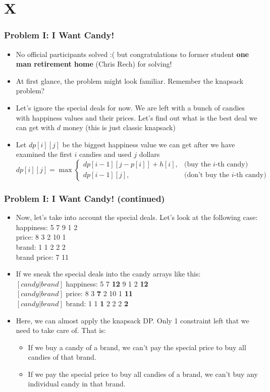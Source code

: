 \section{X}%
\label{sec:X}

\begin{frame}
  \frametitle{Problem I: I Want Candy!}
  \begin{itemize}
    \item No official participants solved :( but congratulations to former student \textbf{one man retirement home} (Chris Rech) for solving!
    \item At first glance, the problem might look familiar. Remember the knapsack problem?
    \item Let's ignore the special deals for now. We are left with a bunch of candies with happiness values and their prices. Let's find out what is the best deal we can get with $d$ money (this is just classic knapsack)
    \item Let $dp[i][j]$ be the biggest happiness value we can get after we have examined the first $i$ candies and used $j$ dollars
      \[ dp[i][j] = \max \begin{cases} dp[i-1][j-p[i]] + h[i], & \text{(buy the $i$-th candy)}\\ dp[i-1][j], & \text{(don't buy the $i$-th candy)} \end{cases}\]
  \end{itemize}
\end{frame}

\begin{frame}
  \frametitle{Problem I: I Want Candy! (continued)}
   \begin{itemize}
    \item Now, let's take into account the special deals. Let's look at the following case:\\
        happiness: 5 7 9 1 2\\
        price: 8 3 2 10 1\\
        brand: 1 1 2 2 2\\
        brand price: 7 11\\
    \item If we sneak the special deals into the candy arrays like this:\\
        $[candy|brand]$ happiness: 5 7 \textbf{12} 9 1 2 \textbf{12}\\
        $[candy|brand]$ price: 8 3 \textbf{7} 2 10 1 \textbf{11}\\
        $[candy|brand]$ brand: 1 1 \textbf{1} 2 2 2 \textbf{2}\\
    \item Here, we can almost apply the knapsack DP. Only 1 constraint left that we need to take care of. That is:
    \begin{itemize}
        \item If we buy a candy of a brand, we can't pay the special price to buy all candies of that brand. 
        \item If we pay the special price to buy all candies of a brand, we can't buy any individual candy in that brand.
    \end{itemize}
  \end{itemize}
\end{frame}

